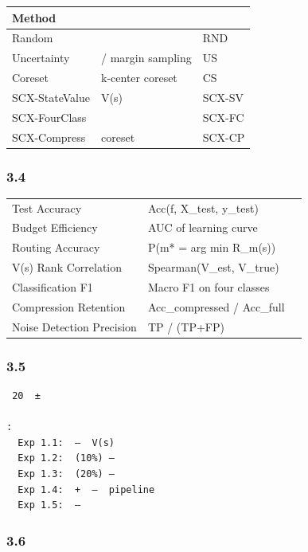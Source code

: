 \documentclass[
  12pt,
]{article}
\begin{document}
\begin{longtable}[]{@{}lll@{}}
\toprule\noalign{}
Method &  &  \\
\midrule\noalign{}
\endhead
\bottomrule\noalign{}
\endlastfoot
Random &  & RND \\
Uncertainty & / margin sampling & US \\
Coreset & k-center coreset & CS \\
SCX-StateValue &  V(s)  & SCX-SV \\
SCX-FourClass &  & SCX-FC \\
SCX-Compress &  coreset  & SCX-CP \\
\end{longtable}

\subsubsection{3.4 }\label{ux8bc4ux4f30ux6307ux6807}

\begin{longtable}[]{@{}lll@{}}
\toprule\noalign{}
 &  &  \\
\midrule\noalign{}
\endhead
\bottomrule\noalign{}
\endlastfoot
Test Accuracy & Acc(f, X\_test, y\_test) &  \\
Budget Efficiency & AUC of learning curve &  \\
Routing Accuracy & P(m* = arg min R\_m(s)) &  \\
V(s) Rank Correlation & Spearman(V\_est, V\_true) &  \\
Classification F1 & Macro F1 on four classes &  \\
Compression Retention & Acc\_compressed / Acc\_full &  \\
Noise Detection Precision & TP / (TP+FP) &  \\
\end{longtable}

\subsubsection{3.5 }\label{ux5b9eux9a8cux8f6eux6b21}

\begin{verbatim}
 20  ± 

:
  Exp 1.1:  —  V(s) 
  Exp 1.2:  (10%) — 
  Exp 1.3:  (20%) — 
  Exp 1.4:  +  —  pipeline 
  Exp 1.5:  — 
\end{verbatim}

\subsubsection{3.6 }\label{ux53efux89c6ux5316ux8981ux6c42}
\end{document}
